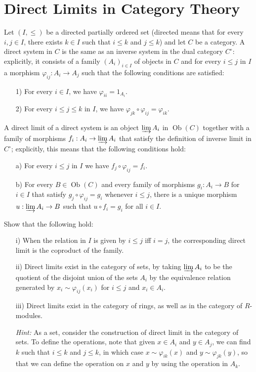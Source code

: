 \documentclass[lang=cn,11pt]{template}
\begin{document}
\section{Direct Limits in Category Theory}
Let \( (I, \leq) \) be a directed partially ordered set (directed means that for every \( i, j \in I \), there exists \( k \in I \) such that \( i \leq k \) and \( j \leq k \)) and let \( C \) be a category. A direct system in \( C \) is the same as an inverse system in the dual category \( C^\circ \): explicitly, it consists of a family \( (A_i)_{i \in I} \) of objects in \( C \) and for every \( i \leq j \) in \( I \) a morphism \( \varphi_{ij} : A_i \rightarrow A_j \) such that the following conditions are satisfied:
\begin{itemize}
    \item[1)] For every \( i \in I \), we have \( \varphi_{ii} = 1_{A_i} \).
    \item[2)] For every \( i \leq j \leq k \) in \( I \), we have \( \varphi_{jk} \circ \varphi_{ij} = \varphi_{ik} \).
\end{itemize}
A direct limit of a direct system is an object \( \varinjlim A_i \) in \( \operatorname{Ob}(C) \) together with a family of morphisms \( f_i : A_i \rightarrow \varinjlim A_i \) that satisfy the definition of inverse limit in \( C^\circ \); explicitly, this means that the following conditions hold:
\begin{itemize}
    \item[a)] For every \( i \leq j \) in \( I \) we have \( f_j \circ \varphi_{ij} = f_i \).
    \item[b)] For every \( B \in \operatorname{Ob}(C) \) and every family of morphisms \( g_i : A_i \rightarrow B \) for \( i \in I \) that satisfy \( g_j \circ \varphi_{ij} = g_i \) whenever \( i \leq j \), there is a unique morphism \( u : \varinjlim A_i \rightarrow B \) such that \( u \circ f_i = g_i \) for all \( i \in I \).
\end{itemize}

Show that the following hold:
\begin{itemize}
    \item[i)] When the relation in \( I \) is given by \( i \leq j \) iff \( i = j \), the corresponding direct limit is the coproduct of the family.
    \item[ii)] Direct limits exist in the category of sets, by taking \( \varinjlim A_i \) to be the quotient of the disjoint union of the sets \( A_i \) by the equivalence relation generated by \( x_i \sim \varphi_{ij}(x_i) \) for \( i \leq j \) and \( x_i \in A_i \).
    \item[iii)] Direct limits exist in the category of rings, as well as in the category of \( R \)-modules.
    
    \textit{Hint:} As a set, consider the construction of direct limit in the category of sets. To define the operations, note that given \( x \in A_i \) and \( y \in A_j \), we can find \( k \) such that \( i \leq k \) and \( j \leq k \), in which case \( x \sim \varphi_{ik}(x) \) and \( y \sim \varphi_{jk}(y) \), so that we can define the operation on \( x \) and \( y \) by using the operation in \( A_k \).
\end{itemize}
\end{document}
